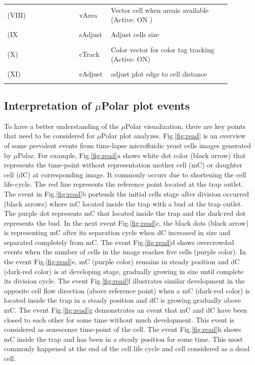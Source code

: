 \documentclass[conference]{IEEEtran}
\begin{document}
\begin{table}[ht]
\begin{tabular}{p{0.3\linewidth}p{0.1\linewidth}p{0.5\linewidth}}
\\
(VIII)& vArea &    Vector cell when areais available (Active: ON ) \\
\\
(IX& sAdjust &     Adjust cells size\\
\\
(X)& cTrack &      Color vector for color tag tracking (Active:  ON)\\
\\
(XI)& eAdjust &    adjust plot edge to cell distance\\
\\
\end{tabular}
\label{table:desc}
\end{table}


\subsection{Interpretation of $\mu$Polar plot events}
To have a better understanding of the $\mu$Polar visualization, there are key points that need to be considered for $\mu$Polar plot analyzes. Fig.\ref{fig:read} is an overview of some prevalent events from time-lapse microfluidic yeast cells  images generated by $\mu$Polar. For example,  Fig.\ref{fig:read}a shows  white dot color (black arrow) that represents the time-point without representation mother cell (mC) or daughter cell (dC) at corresponding image. It commonly occurs due to shortening the cell life-cycle. The red line represents the reference point located at the trap outlet. The event in Fig.\ref{fig:read}b portends the initial cells stage after division occurred (black arrows) where  mC located inside the trap with a bud at the trap outlet.  The purple dot represents mC that located inside the trap and the dark-red dot represents the bud. In the next event Fig.\ref{fig:read}c, the black dots (black arrow) is representing mC after its separation cycle when dC increased in size and separated completely from mC. The event Fig.\ref{fig:read}d shows overcrowded events when the number of cells in the image reaches five cells (purple color). In the event Fig.\ref{fig:read}e, mC (purple color) remains in steady position and dC (dark-red color) is at developing stage, gradually growing in size until complete its division cycle. The event Fig.\ref{fig:read}f illustrates similar development in the opposite cell flow direction (above reference point) when a mC (dark-red color) is located inside the trap in a steady position and dC is growing gradually above mC. The event Fig.\ref{fig:read}g demonstrates an event that mC and dC  have been closed to each other for some time without much development. This event is considered as senescence time-point of the cell. The event Fig.\ref{fig:read}h shows mC inside the trap and has been in a steady position for some time. This most commonly happened at the end of the cell life cycle and cell considered as a dead cell.
\end{document}
